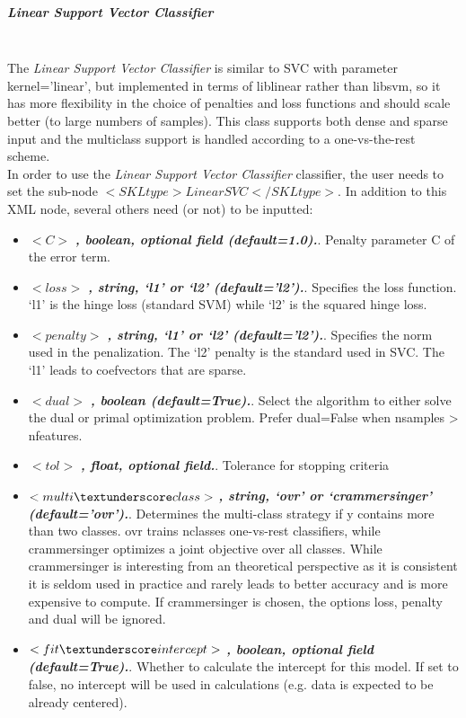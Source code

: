 \subparagraph{Linear Support Vector Classifier}
\mbox{}
\\The \textit{Linear Support Vector Classifier} is similar to SVC with parameter kernel=’linear’, but implemented in terms of liblinear rather than libsvm, so it has more flexibility in the choice of penalties and loss functions and should scale better (to large numbers of samples).
This class supports both dense and sparse input and the multiclass support is handled according to a one-vs-the-rest scheme.
\\In order to use the \textit{Linear Support Vector Classifier} classifier, the user needs to set the sub-node $<SKLtype>LinearSVC</SKLtype>$.
In addition to this XML node, several others need (or not) to be inputted:
\begin{itemize}
  \item $<C>$ \textbf{\textit{, boolean, optional field (default=1.0).}}. Penalty parameter C of the error term.
  \item $<loss>$ \textbf{\textit{, string, ‘l1’ or ‘l2’ (default=’l2’).}}. Specifies the loss function. ‘l1’ is the hinge loss (standard SVM) while ‘l2’ is the squared hinge loss.
  \item $<penalty>$ \textbf{\textit{, string, ‘l1’ or ‘l2’ (default=’l2’).}}. Specifies the norm used in the penalization. The ‘l2’ penalty is the standard used in SVC. The ‘l1’ leads to coef\textunderscore  vectors that are sparse.
  \item $<dual>$ \textbf{\textit{, boolean (default=True).}}. Select the algorithm to either solve the dual or primal optimization problem. Prefer dual=False when n\textunderscore samples > n\textunderscore features.
  \item $<tol>$ \textbf{\textit{, float, optional field.}}. Tolerance for stopping criteria
  \item $<multi\textunderscore class>$ \textbf{\textit{, string, ‘ovr’ or ‘crammer\textunderscore singer’ (default=’ovr’).}}. Determines the multi-class strategy if y contains more than two classes. ovr trains n\textunderscore classes one-vs-rest classifiers, while crammer\textunderscore singer optimizes a joint objective over all classes. While crammer\textunderscore singer is interesting from an theoretical perspective as it is consistent it is seldom used in practice and rarely leads to better accuracy and is more expensive to compute. If crammer\textunderscore singer is chosen, the options loss, penalty and dual will be ignored.
  \item $<fit\textunderscore intercept>$ \textbf{\textit{, boolean, optional field (default=True).}}. Whether to calculate the intercept for this model. If set to false, no intercept will be used in calculations (e.g. data is expected to be already centered).

\end{itemize}
